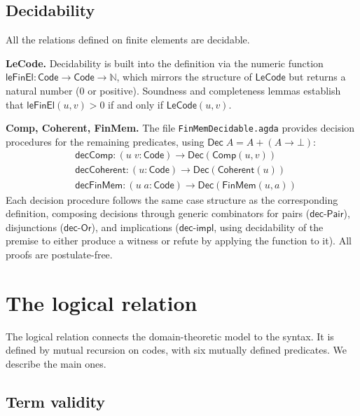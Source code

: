 \documentclass[11pt]{article}
\newcommand{\FinEl}{\mathsf{Code}}
\begin{document}
\subsection{Decidability}

All the relations defined on finite elements are decidable.

\medskip\noindent\textbf{LeCode.}
Decidability is built into the definition via the numeric function
$\mathsf{leFinEl} : \FinEl \to \FinEl \to \mathbb{N}$, which mirrors the
structure of $\mathsf{LeCode}$ but returns a natural number (0 or positive).
Soundness and completeness lemmas establish that $\mathsf{leFinEl}(u,v) > 0$
if and only if $\mathsf{LeCode}(u,v)$.

\medskip\noindent\textbf{Comp, Coherent, FinMem.}
The file \texttt{FinMemDecidable.agda} provides decision procedures for
the remaining predicates, using $\mathsf{Dec}\;A = A + (A \to \bot)$:
\begin{align*}
  &\mathsf{decComp}   : (u\;v : \FinEl) \to \mathsf{Dec}(\mathsf{Comp}(u,v)) \\
  &\mathsf{decCoherent} : (u : \FinEl) \to \mathsf{Dec}(\mathsf{Coherent}(u)) \\
  &\mathsf{decFinMem} : (u\;a : \FinEl) \to \mathsf{Dec}(\mathsf{FinMem}(u,a))
\end{align*}
Each decision procedure follows the same case structure as the corresponding
definition, composing decisions through generic combinators for pairs
($\mathsf{dec\text{-}Pair}$), disjunctions ($\mathsf{dec\text{-}Or}$), and
implications ($\mathsf{dec\text{-}impl}$, using decidability of the premise
to either produce a witness or refute by applying the function to it).
All proofs are postulate-free.

\section{The logical relation}

The logical relation connects the domain-theoretic model to the syntax.
It is defined by mutual recursion on codes, with six mutually defined
predicates.  We describe the main ones.

\subsection{Term validity}
\end{document}
